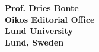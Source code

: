 \documentclass[12pt]{letter}
\begin{document}
\begin{letter}{\bf Prof. Dries Bonte\\
Oikos Editorial Office \\
Lund University \\
Lund, Sweden}









\end{letter}
\end{document}
